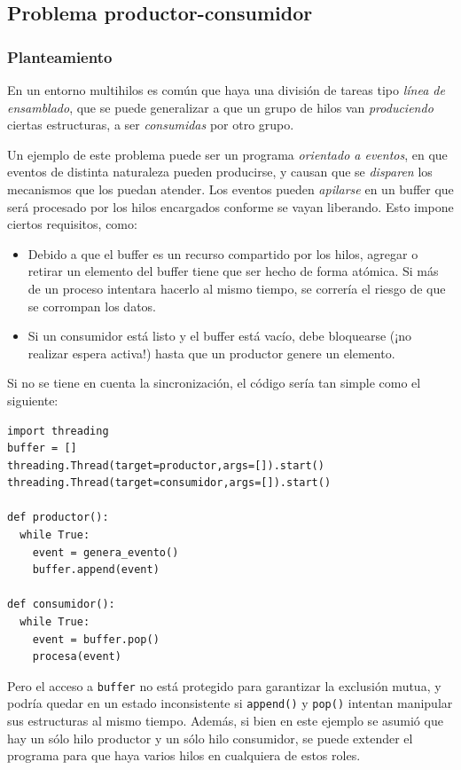 \documentclass[11pt,fleqn]{book} %
\begin{document}
\subsection{Problema productor-consumidor}
\label{sec-3-3-4}
\subsubsection{Planteamiento}
\label{sec-3-3-4-1}

En un entorno multihilos es común que haya una división de tareas tipo
\emph{línea de ensamblado}, que se puede generalizar a que un grupo de
hilos van \emph{produciendo} ciertas estructuras, a ser \emph{consumidas} por
otro grupo.

Un ejemplo de este problema puede ser un programa \emph{orientado a eventos}, en que eventos de distinta naturaleza pueden producirse, y
causan que se \emph{disparen} los mecanismos que los puedan atender. Los
eventos pueden \emph{apilarse} en un buffer que será procesado por los
hilos encargados conforme se vayan liberando. Esto impone ciertos
requisitos, como:

\begin{itemize}
\item Debido a que el buffer es un recurso compartido por los hilos,
	agregar o retirar un elemento del buffer tiene que ser hecho de
       forma atómica. Si más de un proceso intentara hacerlo al mismo
       tiempo, se correría el riesgo de que se corrompan los datos.
\item Si un consumidor está listo y el buffer está vacío, debe
       bloquearse (¡no realizar espera activa!) hasta que un productor
       genere un elemento.
\end{itemize}

  Si no se tiene en cuenta la sincronización, el código sería tan
  simple como el siguiente:


\begin{verbatim}
import threading
buffer = []
threading.Thread(target=productor,args=[]).start()
threading.Thread(target=consumidor,args=[]).start()

def productor():
  while True:
    event = genera_evento()
    buffer.append(event)

def consumidor():
  while True:
    event = buffer.pop()
    procesa(event)
\end{verbatim}

  Pero el acceso a \texttt{buffer} no está protegido para garantizar la
  exclusión mutua, y podría quedar en un estado inconsistente si
  \texttt{append()} y \texttt{pop()} intentan manipular sus estructuras al mismo
  tiempo. Además, si bien en este ejemplo se asumió que hay un sólo hilo
  productor y un sólo hilo consumidor, se puede extender el programa
  para que haya varios hilos en cualquiera de estos roles.
\end{document}
